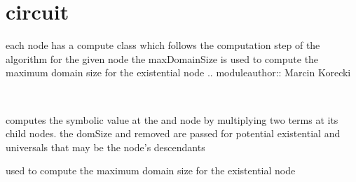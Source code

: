 \documentclass[letterpaper,10pt,english]{sphinxmanual}
\begin{document}
\chapter{circuit}
\label{\detokenize{index:module-circuit}}\label{\detokenize{index:circuit}}\label{\detokenize{index:module-2}}
each node has a compute class which follows the computation step of the algorithm for the given node
the maxDomainSize is used to compute the maximum domain size for the existential node
.. moduleauthor:: Marcin Korecki

\begin{fulllineitems}
\label{\detokenize{index:circuit.AndNode}}~

\begin{fulllineitems}
\label{\detokenize{index:circuit.AndNode.compute}}
computes the symbolic value at the and node by multiplying two terms at its child nodes. the domSize and removed are passed for 
potential existential and universals that may be the node’s descendants

\end{fulllineitems}


\begin{fulllineitems}
\label{\detokenize{index:circuit.AndNode.maxDomainSize}}
used to compute the maximum domain size for the existential node

\end{fulllineitems}


\end{fulllineitems}
\end{document}
